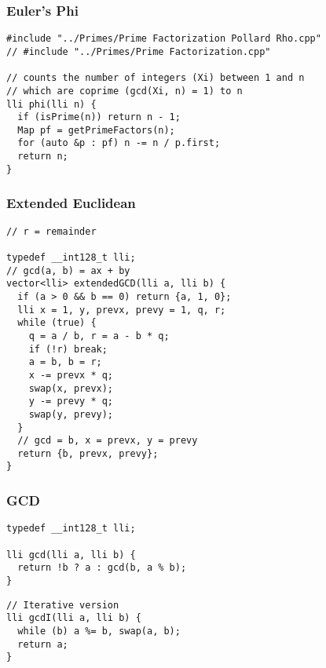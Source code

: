 \documentclass[twoside]{article}
\begin{document}
\begin{multicols*}{2}
\subsubsectionfont{\large\bfseries\sffamily\underline}
\subsubsection*{Euler's Phi}
\begin{verbatim}
#include "../Primes/Prime Factorization Pollard Rho.cpp"
// #include "../Primes/Prime Factorization.cpp"

// counts the number of integers (Xi) between 1 and n
// which are coprime (gcd(Xi, n) = 1) to n
lli phi(lli n) {
  if (isPrime(n)) return n - 1;
  Map pf = getPrimeFactors(n);
  for (auto &p : pf) n -= n / p.first;
  return n;
}
\end{verbatim}

\subsubsectionfont{\large\bfseries\sffamily\underline}
\subsubsection*{Extended Euclidean}
\begin{verbatim}
// r = remainder

typedef __int128_t lli;
// gcd(a, b) = ax + by
vector<lli> extendedGCD(lli a, lli b) {
  if (a > 0 && b == 0) return {a, 1, 0};
  lli x = 1, y, prevx, prevy = 1, q, r;
  while (true) {
    q = a / b, r = a - b * q;
    if (!r) break;
    a = b, b = r;
    x -= prevx * q;
    swap(x, prevx);
    y -= prevy * q;
    swap(y, prevy);
  }
  // gcd = b, x = prevx, y = prevy
  return {b, prevx, prevy};
}
\end{verbatim}

\subsubsectionfont{\large\bfseries\sffamily\underline}
\subsubsection*{GCD}
\begin{verbatim}
typedef __int128_t lli;

lli gcd(lli a, lli b) {
  return !b ? a : gcd(b, a % b);
}
\end{verbatim}
\vspace{-12pt}
\begin{verbatim}
// Iterative version
lli gcdI(lli a, lli b) {
  while (b) a %= b, swap(a, b);
  return a;
}
\end{verbatim}


\end{multicols*}
\end{document}
